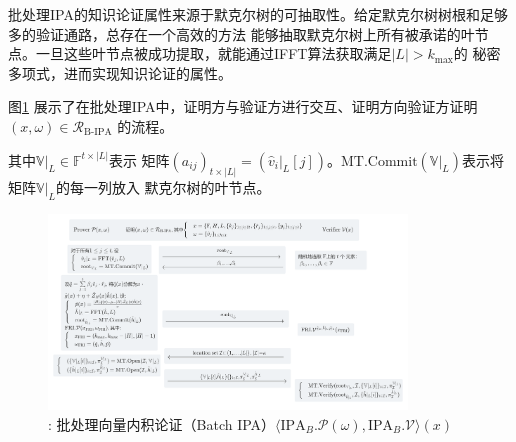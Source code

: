 \documentclass[zihao=-4]{ctexart}
\begin{document}
\begin{spacing}{1.5}
\begin{itemize}
\begin{equation}
        \end{equation}
        批处理IPA的知识论证属性来源于默克尔树的可抽取性。给定默克尔树树根和足够多的验证通路，总存在一个高效的方法
        能够抽取默克尔树上所有被承诺的叶节点。一旦这些叶节点被成功提取，就能通过IFFT算法获取满足$|L|>k_{\max}$的
        秘密多项式，进而实现知识论证的属性\cite{seven}\cite{Fourty-two}。
\end{itemize}\par
图\ref{B-IPA流程} 展示了在批处理IPA中，证明方与验证方进行交互、证明方向验证方证明$(x,\omega)\in\mathcal{R}_{\text{B-IPA}}$
的流程。\par
其中$\mathbb{V}|_L\in\mathbb{F}^{t\times|L|}$表示
矩阵$(a_{ij})_{t\times|L|}=(\hat{v}_i|_L[j])$。$\text{MT.Commit}(\mathbb{V}|_L)$表示将矩阵$\mathbb{V}|_L$的每一列放入
默克尔树的叶节点。
\begin{figure}[H]
  \centering
  \includegraphics[width=0.85\textwidth]{./include_picture/B-IPA.png}
  \caption{: 批处理向量内积论证（Batch IPA）$\langle \text{IPA}_B.\mathcal{P}(\omega),\text{IPA}_B.\mathcal{V}\rangle(x)$}
  \label{B-IPA流程}
\end{figure}


\end{spacing}
\end{document}
